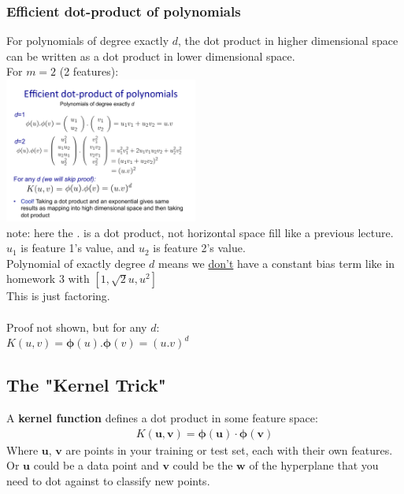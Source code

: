 \subsubsection{Efficient dot-product of polynomials}
For polynomials of degree exactly $d$, the dot product in higher dimensional space can be written as a dot product in lower dimensional space.  \hfill \\
For $m=2$ (2 features): \hfill \\
\includegraphics[width=2.5in]{figures/kernel_dot_polynomials.pdf}  \hfill \\
note: here the $.$ is a dot product, not horizontal space fill like a previous lecture. \hfill \\
$u_1$ is feature 1's value, and $u_2$ is feature 2's value. \hfill \\
Polynomial of exactly degree $d$ means we \underline{don't} have a constant bias term like in homework 3 with $[1, \sqrt{2}u, u^2]$  \hfill \\
This is just factoring.  \hfill \\
\hfill \\

Proof not shown, but for any $d$: \hfill \\
$K(u, v) = \bm{\phi}(u).\bm{\phi}(v) = (u.v)^d$

\subsection{The "Kernel Trick"}
A \textbf{kernel function} defines a dot product in some feature space: 
\begin{align*}
	K(\bm{u}, \bm{v}) =\bm{\phi}(\bm{u}) \cdot \bm{\phi}(\bm{v})
\end{align*}
Where $\bm{u}$, $\bm{v}$ are points in your training or test set, each with their own features. \hfill \\ 
Or $\bm{u}$ could be a data point and $\bm{v}$ could be the $\bm{w}$ of the hyperplane that you need to dot against to classify new points.
 \hfill \\
 
